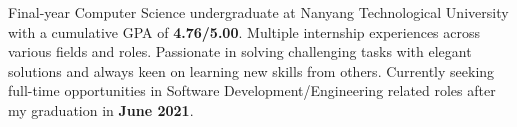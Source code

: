 

\begin{cvparagraph}

Final-year Computer Science undergraduate at Nanyang Technological University with a cumulative GPA of \textbf{4.76/5.00}. Multiple internship experiences across various fields and roles. Passionate in solving challenging tasks with elegant solutions and always keen on learning new skills from others. Currently seeking full-time opportunities in Software Development/Engineering related roles after my graduation in \textbf{June 2021}.
\end{cvparagraph}
